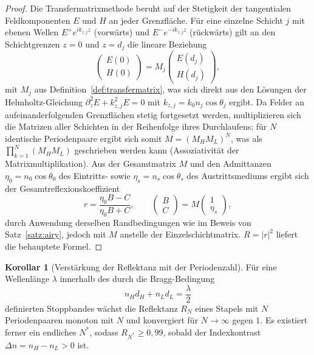 ﻿\documentclass[a4paper,12pt]{article}
\theoremstyle{definition}
\newtheorem{korollar}{Korollar}
\begin{document}
\begin{proof}
	Die Transfermatrixmethode beruht auf der Stetigkeit der tangentialen
	Feldkomponenten $E$ und $H$ an jeder Grenzfläche. Für eine einzelne
	Schicht $j$ mit ebenen Wellen $E^{+}e^{ik_{z,j}z}$ (vorwärts) und
	$E^{-}e^{-ik_{z,j}z}$ (rückwärts) gilt an den Schichtgrenzen $z=0$ und
	$z=d_j$ die lineare Beziehung
	\[
	\begin{pmatrix}E(0)\\H(0)\end{pmatrix}
	= M_j \begin{pmatrix}E(d_j)\\H(d_j)\end{pmatrix},
	\]
	mit $M_j$ aus Definition~\ref{def:transfermatrix}, was sich direkt aus
	den Lösungen der Helmholtz-Gleichung
	$\partial_z^2 E + k_{z,j}^2 E = 0$ mit $k_{z,j}=k_0 n_j\cos\theta_j$
	ergibt. Da Felder an aufeinanderfolgenden Grenzflächen stetig fortgesetzt
	werden, multiplizieren sich die Matrizen aller Schichten in der
	Reihenfolge ihres Durchlaufens; für $N$ identische Periodenpaare ergibt
	sich somit $M = (M_HM_L)^N$, was als $\prod_{k=1}^N(M_HM_L)$ geschrieben
	werden kann (Assoziativität der Matrixmultiplikation).
	Aus der Gesamtmatrix $M$ und den Admittanzen $\eta_0=n_0\cos\theta_0$ des
	Eintritts- sowie $\eta_s=n_s\cos\theta_s$ des Austrittsmediums ergibt
	sich der Gesamtreflexionskoeffizient
	\[
	r = \frac{\eta_0 B - C}{\eta_0 B + C}, \qquad
	\begin{pmatrix}B\\C\end{pmatrix} = M
	\begin{pmatrix}1\\\eta_s\end{pmatrix},
	\]
	durch Anwendung derselben Randbedingungen wie im Beweis von
	Satz~\ref{satz:airy}, jedoch mit $M$ anstelle der Einzelschichtmatrix.
	$R=|r|^2$ liefert die behauptete Formel.
\end{proof}

\begin{korollar}[Verstärkung der Reflektanz mit der Periodenzahl]
	\label{kor:periodenzahl}
	Für eine Wellenlänge $\lambda$ innerhalb des durch die Bragg-Bedingung
	\[
	n_H d_H + n_L d_L = \frac{\lambda}{2}
	\]
	definierten Stoppbandes wächst die Reflektanz $R_N$ eines Stapels mit
	$N$ Periodenpaaren monoton mit $N$ und konvergiert für $N\to\infty$
	gegen $1$. Es existiert ferner ein endliches $N^*$, sodass
	$R_{N^*} \ge 0{,}99$, sobald der Indexkontrast
	$\Delta n = n_H - n_L > 0$ ist.
\end{korollar}
\end{document}
